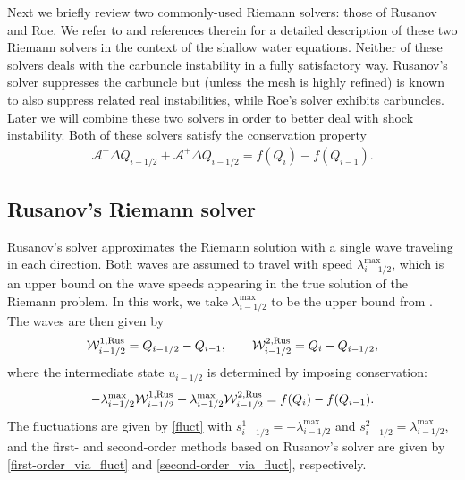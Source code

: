 \documentclass[preprint, 11pt]{article}
\newcommand{\W}{{\mathcal W}}
\newcommand{\A}{{\mathcal A}}
\newcommand{\apdq}{\A^+ \!\!{\Delta} Q}
\newcommand{\amdq}{\A^- \!\!{\Delta} Q}
\newcommand{\imh}{{i-1/2}}
\newcommand{\bff}{{f}}
\newcommand{\bfu}{{u}}
\newcommand{\bfq}{{Q}}
\newcommand{\Rus}{{\rm Rus}}
\begin{document}
Next we briefly review two commonly-used Riemann solvers: those of Rusanov and
Roe.  We refer to \cite{ketcheson2020riemann} and references therein for
a detailed description of these two Riemann solvers in the context of
the shallow water equations.
Neither of these solvers deals with the carbuncle instability in a fully
satisfactory way.  Rusanov's solver suppresses the carbuncle but 
(unless the mesh is highly refined)
is known to
also suppress related real instabilities, while Roe's solver exhibits carbuncles.
Later we will combine these two solvers in order to better deal with shock instability.
Both of these solvers satisfy the conservation property
\begin{align} \label{rs_conservation}
    \amdq_\imh + \apdq_\imh = \bff(\bfq_i) - \bff(\bfq_{i-1}).
\end{align}


\subsection{Rusanov's Riemann solver}\label{sec:rusanov}
Rusanov's solver approximates the Riemann solution with a single wave traveling in each
direction.  Both waves are assumed to travel with speed $\lambda^{\max}_\imh$, which is an
upper bound on the wave speeds appearing in the true solution of the Riemann problem.
In this work, we take $\lambda_{i-1/2}^{\max}$ to be the upper bound
from \cite[Prop. 3.7]{azerad2017well}.
The waves are then given by
\begin{align}\label{rusanov_waves}
  \W_{i-1/2}^{1,\Rus}=\bfq_{i-1/2}-\bfq_{i-1}, \qquad
  \W_{i-1/2}^{2,\Rus}=\bfq_{i}-\bfq_{i-1/2},
\end{align}
where the intermediate state $\bfu_{i-1/2}$ is determined by imposing conservation:
\begin{align}\label{rus_cons}
  -\lambda_{i-1/2}^{\max}\W_{i-1/2}^{1,\Rus}+\lambda_{i-1/2}^{\max}\W_{i-1/2}^{2,\Rus} = \bff(\bfq_{i})-\bff(\bfq_{i-1}).
\end{align}
The fluctuations are given by \eqref{fluct} with $s_{i-1/2}^1=-\lambda_{i-1/2}^{\max}$
and $s_{i-1/2}^2=\lambda_{i-1/2}^{\max}$, and the first- and second-order methods based
on Rusanov's solver are given by \eqref{first-order_via_fluct} and \eqref{second-order_via_fluct}, respectively.
\end{document}
